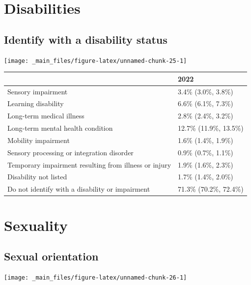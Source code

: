 \documentclass[
]{book}
\begin{document}
\hypertarget{disabilities}{%
\section{Disabilities}\label{disabilities}}

\hypertarget{identify-with-a-disability-status}{%
\subsection{Identify with a disability status}\label{identify-with-a-disability-status}}

\texttt{[image: \_main\_files/figure-latex/unnamed-chunk-25-1]}

\begin{table}
\centering
\begin{tabular}[t]{>{}l|>{}l}
\hline
  & 2022\\
\hline
Sensory impairment & 3.4\% (3.0\%, 3.8\%)\\
\hline
Learning disability & 6.6\% (6.1\%, 7.3\%)\\
\hline
Long-term medical 
 illness & 2.8\% (2.4\%, 3.2\%)\\
\hline
Long-term mental health 
 condition & 12.7\% (11.9\%, 13.5\%)\\
\hline
Mobility impairment & 1.6\% (1.4\%, 1.9\%)\\
\hline
Sensory processing or 
 integration disorder & 0.9\% (0.7\%, 1.1\%)\\
\hline
Temporary impairment resulting 
 from illness or injury & 1.9\% (1.6\%, 2.3\%)\\
\hline
Disability not listed & 1.7\% (1.4\%, 2.0\%)\\
\hline
Do not identify with a 
 disability or impairment & 71.3\% (70.2\%, 72.4\%)\\
\hline
\end{tabular}
\end{table}

\hypertarget{sexuality}{%
\section{Sexuality}\label{sexuality}}

\hypertarget{sexual-orientation}{%
\subsection{Sexual orientation}\label{sexual-orientation}}

\texttt{[image: \_main\_files/figure-latex/unnamed-chunk-26-1]}
\end{document}
